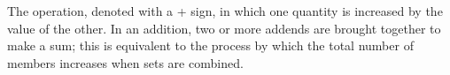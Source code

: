 The operation, denoted with a + sign, in which one quantity
is increased by the value of the other. In an addition, two or more
addends are brought together to make a sum; this is equivalent
to the process by which the total number of members increases
when sets are combined.